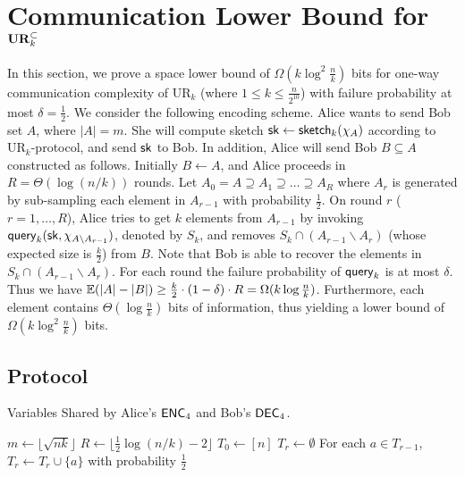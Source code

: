 \section{Communication Lower Bound for $\mathbf{UR}_k^\subset$}\label{sec:k-samples-lb}

In this section, we prove a space lower bound of $\Omega(k\log^2
\frac{n}{k})$ bits for one-way communication complexity of UR$_k$ (where $1\le k \le \frac{n}{2^{10}}$) with failure probability at most $\delta = \frac{1}{2}$.
We consider the following encoding scheme. 
Alice wants to send Bob set $A$, where $|A|=m$. 
She will compute sketch $\mathsf{sk}\leftarrow \mathsf{sketch}_k(\chi_A)$ according to UR$_k$-protocol, and send $\mathsf{sk}$ to Bob. 
In addition, Alice will send Bob $B\subseteq A$ constructed as follows.
Initially $B\leftarrow A$, and Alice proceeds in $R=\Theta(\log (n/k))$ rounds. 
Let $A_0=A\supseteq A_1\supseteq \ldots \supseteq A_R$ where $A_r$ is generated by sub-sampling each element in $A_{r-1}$ with probability $\frac{1}{2}$. 
On round $r$ ($r=1,\ldots, R$), Alice tries to get $k$ elements from $A_{r-1}$ by invoking $\mathsf{query}_k(\mathsf{sk}, \chi_{A\backslash A_{r-1}})$, denoted by $S_k$, and removes $S_k\cap (A_{r-1}\backslash A_{r})$ (whose expected size is $\frac{k}{2}$) from $B$. 
Note that Bob is able to recover the elements in $S_k\cap (A_{r-1}\backslash A_{r})$. 
For each round the failure probability of $\mathsf{query}_k$ is at most $\delta$. 
Thus we have $\operatorname*{\mathbb{E}}(|A|-|B|)\ge \frac{k}{2}\cdot (1-\delta) \cdot R=\Omega(k\log\frac{n}{k})$. 
Furthermore, each element contains $\Theta(\log \frac{n}{k})$ bits of information, thus yielding a lower bound of $\Omega(k\log^2\frac{n}{k})$ bits.

\subsection{Protocol}
\begin{algorithm}[H] 
  \caption{Variables Shared by Alice's $\textsf{ENC}_4$ and Bob's $\textsf{DEC}_4$.} \label{algo:para4}
  \begin{algorithmic}[1] 
    \State $m\leftarrow \lfloor \sqrt{nk} \rfloor$
    \State $R\leftarrow \lfloor \frac{1}{2}\log (n/k) - 2 \rfloor$ 
    \State $T_0\leftarrow [n]$
      \State $T_r\leftarrow \emptyset$
      \State For each $a\in T_{r-1}$, $T_r\leftarrow T_r\cup \{a\}$ with probability $\frac{1}{2}$ 
    \EndFor
  \end{algorithmic}
\end{algorithm}

